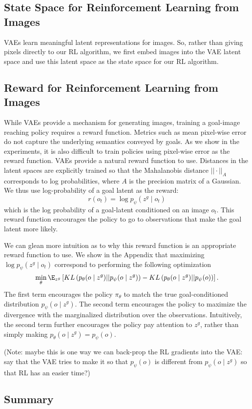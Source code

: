 \subsection{State Space for Reinforcement Learning from Images}
VAEs learn meaningful latent representations for images.
So, rather than giving pixels directly to our RL algorithm, we first embed images into the VAE latent space and use this latent space as the state space for our RL algorithm.

\subsection{Reward for Reinforcement Learning from Images}
While VAEs provide a mechanism for generating images, training a goal-image reaching policy requires a reward function.
Metrics such as mean pixel-wise error do not capture the underlying semantics conveyed by goals.
As we show in the experiments, it is also difficult to train policies using pixel-wise error as the reward function.
VAEs provide a natural reward function to use.
Distances in the latent spaces are explicitly trained so that the Mahalanobis distance $|| \cdot ||_A$ corresponds to log probabilities, where $A$ is the precision matrix of a Gaussian.
We thus use log-probability of a goal latent as the reward:
\begin{equation}
    r(o_t) = \log p_\psi(z^g \mid o_t)
\end{equation}
which is the log probability of a goal-latent conditioned on an image $o_t$.
This reward function encourages the policy to go to observations that make the goal latent more likely.

We can glean more intuition as to why this reward function is an appropriate reward function to use.
We show in the Appendix that maximizing $\log p_\psi(z^g \mid o_t)$ correspond to performing the following optimization
\begin{equation}
    \min_\theta \E_{z^g} \left[KL\left(p_\theta(o \mid z^g) || p_\psi(o \mid z^g)\right)
    - KL\left(p_\theta(o \mid z^g) || p_\psi(o)\right)\right].
\end{equation}
The first term encourages the policy $\pi_\theta$ to match the true goal-conditioned distribution $p_\psi(o \mid z^g)$.
The second term encourages the policy to maximize the divergence with the marginalized distribution over the observations.
Intuitively, the second term further encourages the policy pay attention to $z^g$, rather than simply making $p_\theta(o \mid z^g) = p_\psi(o)$.

(Note: maybe this is one way we can back-prop the RL gradients into the VAE: say that the VAE tries to make it so that $p_\psi(o)$ is different from $p_\psi(o \mid z^g)$ so that RL has an easier time?)

\subsection{Summary}